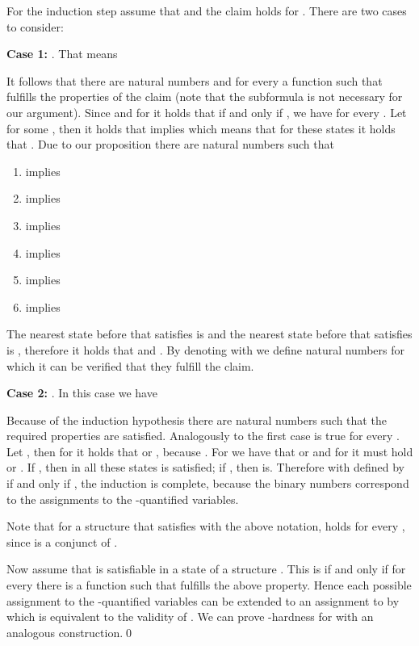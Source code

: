         For the induction step assume that  and the claim holds for . There are two cases to consider:

        \begin{EcoEnum}
          \item[\textbf{Case 1:}] . That means
            
            It follows that there are natural numbers  and for every  a function  such that  fulfills the properties of the claim (note that the subformula  is not necessary for our argument). Since  and for  it holds that  if and only if , we have  for every . Let  for some , then it holds that  implies  which means that for these states  it holds that . Due to our proposition there are natural numbers  such that
            \begin{enumerate}[]
\item  implies 
              \item  implies 
	      \item  implies 
              \item  implies 
              \item  implies 
              \item  implies 
            \end{enumerate}
            The nearest state before  that satisfies  is  and the nearest state before  that satisfies  is , therefore it holds that  and . By denoting  with  we define natural numbers  for which it can be verified that they fulfill the claim.

          \item[\textbf{Case 2:}] . In this case we have
            
          Because of the induction hypothesis there are natural numbers  such that the required properties are satisfied. Analogously to the first case  is true for every . Let , then for  it holds that  or , because . For  we have that  or  and for  it must hold  or . If , then in all these states  is satisfied; if , then  is. Therefore with  defined by  if and only if , the induction is complete, because the binary numbers correspond to the assignments to the -quantified variables.
        \end{EcoEnum}
        Note that for a structure that satisfies  with the above notation,  holds for every , since  is a conjunct of .

        Now assume that  is satisfiable in a state  of a structure . This is if and only if for every  there is a function  such that  fulfills the above property. Hence each possible assignment  to the -quantified variables  can be extended to an assignment to  by  which is equivalent to the validity of .
        We can prove \PSPACE-hardness for  with an analogous construction.\qed
